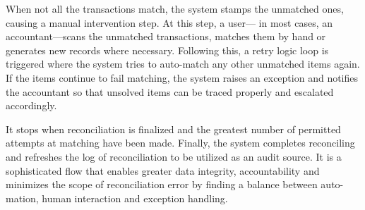 \documentclass[11pt,a4paper]{article}
\begin{document}
\noindent
\begin{minipage}{0.5\textwidth}
When not all the transactions match, the 
system stamps the unmatched ones, causing a 
manual intervention step. At this step, a user—
in most cases, an accountant—scans the
unmatched transactions, matches them by hand 
or generates new records where necessary. 
Following this, a retry logic loop is triggered 
where the system tries to auto-match any 
other unmatched items again. If the items 
continue to fail matching, the system raises an 
exception and notifies the 
accountant so that unsolved items 
can be traced properly and 
escalated accordingly.
\medskip

It stops when reconciliation is 
finalized and the greatest number of 
permitted attempts at 
matching have been made. Finally, 
the system completes reconciling 
and refreshes the log of 
reconciliation to be utilized as an 
audit source. It is a sophisticated 
flow that enables greater data integrity, accountability and 
minimizes the scope of reconciliation error by finding a balance 
between auto-mation, human interaction and exception handling.
\end{minipage}%
\hfill
\end{document}
